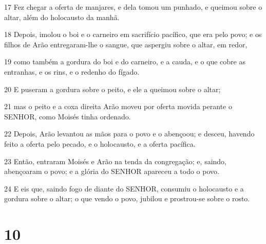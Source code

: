 \par 17 Fez chegar a oferta de manjares, e dela tomou um punhado, e queimou sobre o altar, além do holocausto da manhã.
\par 18 Depois, imolou o boi e o carneiro em sacrifício pacífico, que era pelo povo; e os filhos de Arão entregaram-lhe o sangue, que aspergiu sobre o altar, em redor,
\par 19 como também a gordura do boi e do carneiro, e a cauda, e o que cobre as entranhas, e os rins, e o redenho do fígado.
\par 20 E puseram a gordura sobre o peito, e ele a queimou sobre o altar;
\par 21 mas o peito e a coxa direita Arão moveu por oferta movida perante o SENHOR, como Moisés tinha ordenado.
\par 22 Depois, Arão levantou as mãos para o povo e o abençoou; e desceu, havendo feito a oferta pelo pecado, e o holocausto, e a oferta pacífica.
\par 23 Então, entraram Moisés e Arão na tenda da congregação; e, saindo, abençoaram o povo; e a glória do SENHOR apareceu a todo o povo.
\par 24 E eis que, saindo fogo de diante do SENHOR, consumiu o holocausto e a gordura sobre o altar; o que vendo o povo, jubilou e prostrou-se sobre o rosto.

\chapter{10}

